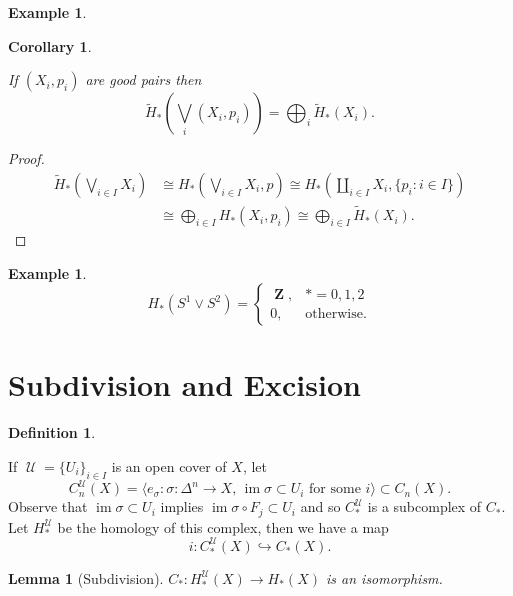 \documentclass[10pt,]{book}
\theoremstyle{plain}
\newtheorem{corollary}[theorem]{Corollary}
\newtheorem{lemma}[theorem]{Lemma}
\theoremstyle{definition}
\newtheorem{definition}[theorem]{Definition}
\newtheorem{example}[theorem]{Example}
\numberwithin{equation}{section}
\DeclareMathOperator{\im}{im}
\DeclareMathOperator{\ZZ}{\mathbf{Z}}
\DeclareMathOperator{\U}{\mathcal{U}}
\begin{document}
\begin{example}\label{example-14}
\end{example}
\begin{corollary}\label{corollary-5}

              If \((X_i, p_i)\) are good pairs then
              \[
                \tilde H_*\left(\bigvee_{i}(X_i, p_i)\right) = \bigoplus_i \tilde H_*(X_i).
              \]\end{corollary}
\begin{proof}
\begin{align*}
\tilde H_*\left(\bigvee_{i\in I} X_i\right) &\cong H_*\left(\bigvee_{i\in I} X_i, p\right) \cong H_*\left(\coprod_{i\in I} X_i, \{p_i : i\in I\}\right)\\
&\cong \bigoplus_{i\in I} H_*\left(X_i, p_i\right) \cong \bigoplus_{i\in I} \tilde H_*(X_i).
\end{align*}\end{proof}
\begin{example}\label{example-15}
\[
                H_*(S^1 \vee S^2) = \begin{cases}\ZZ, &* = 0,1,2\\0, &\text{otherwise}.\end{cases}
              \]\end{example}
\typeout{************************************************}
\typeout{************************************************}
\section[Subdivision and Excision]{Subdivision and Excision}\label{section-5}
\begin{definition}\label{definition-18}

            If \(\U = \{U_i\}_{i\in I}\) is an open cover of \(X\), let
            \[
              C^{\U}_n(X) = \langle e_\sigma : \sigma\colon \Delta^n \to X,\,\im\sigma\subset U_i\text{ for some }i\rangle \subset C_n(X).
            \]
            Observe that \(\im \sigma \subset U_i\) implies \(\im \sigma \circ F_j \subset U_i\) and so \(C^{\U}_*\) is a subcomplex of \(C_*\).
            Let \(H^{\U}_*\) be the homology of this complex, then we have a map
            \[
              i\colon C^{\U}_*(X) \hookrightarrow C_*(X).
            \]\end{definition}
\begin{lemma}[Subdivision]\label{lemma-6}
\(C_*\colon H^{\U}_*(X) \to H_*(X)\) is an isomorphism.
          \end{lemma}
\typeout{************************************************}
\typeout{************************************************}
\end{document}
